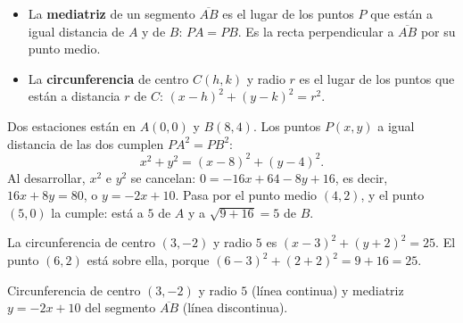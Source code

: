 \documentclass[11pt]{article}
\begin{document}
\begin{itemize}
  \item La \textbf{mediatriz} de un segmento $\overline{AB}$ es el lugar de los
        puntos $P$ que están a igual distancia de $A$ y de $B$: $PA = PB$. Es la
        recta perpendicular a $\overline{AB}$ por su punto medio.
  \item La \textbf{circunferencia} de centro $C(h, k)$ y radio $r$ es el lugar
        de los puntos que están a distancia $r$ de $C$:
        $(x - h)^2 + (y - k)^2 = r^2$.
\end{itemize}

\begin{ejemplo}[La mediatriz]
Dos estaciones están en $A(0, 0)$ y $B(8, 4)$. Los puntos $P(x, y)$ a igual
distancia de las dos cumplen $PA^2 = PB^2$:
\[ x^2 + y^2 = (x - 8)^2 + (y - 4)^2. \]
Al desarrollar, $x^2$ e $y^2$ se cancelan: $0 = -16x + 64 - 8y + 16$, es decir,
$16x + 8y = 80$, o $y = -2x + 10$. Pasa por el punto medio $(4, 2)$, y el
punto $(5, 0)$ la cumple: está a $5$ de $A$ y a $\sqrt{9 + 16} = 5$ de $B$.
\end{ejemplo}

\begin{ejemplo}[La circunferencia]
La circunferencia de centro $(3, -2)$ y radio $5$ es
$(x - 3)^2 + (y + 2)^2 = 25$. El punto $(6, 2)$ está sobre ella, porque
$(6 - 3)^2 + (2 + 2)^2 = 9 + 16 = 25$.
\end{ejemplo}

\begin{center}
\begin{minipage}{\linewidth}\centering
{}

{\small Circunferencia de centro $(3, -2)$ y radio $5$ (línea continua) y
mediatriz $y = -2x + 10$ del segmento $\overline{AB}$ (línea discontinua).}
\end{minipage}
\end{center}
\end{document}
